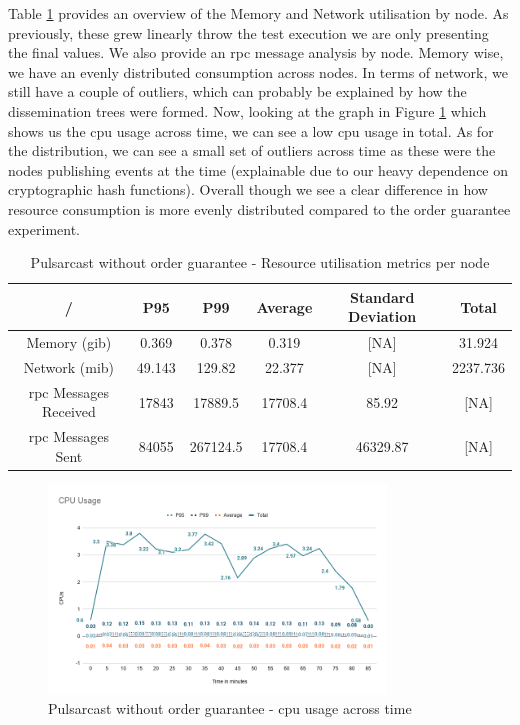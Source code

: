 Table \ref{table:pulsarcast} provides an overview of the Memory and Network
utilisation by node. As previously, these grew linearly throw the test
execution we are only presenting the final values. We also provide an
\acrshort{rpc} message analysis by node. Memory wise, we have an evenly
distributed consumption across nodes. In terms of network, we still have a
couple of outliers, which can probably be explained by how the dissemination
trees were formed.  Now, looking at the graph in Figure
\ref{fig:graph-pulsarcast-cpu} which shows us the \acrshort{cpu} usage across
time, we can see a low \acrshort{cpu} usage in total. As for the distribution,
we can see a small set of outliers across time as these were the nodes
publishing events at the time (explainable due to our heavy dependence on
cryptographic hash functions).  Overall though we see a clear difference in how
resource consumption is more evenly distributed compared to the order guarantee
experiment.

\begin{table}[!htb]
\caption{Pulsarcast without order guarantee - Resource utilisation metrics per node}
\label{table:pulsarcast}
  \begin{center}
   \begin{tabular}{|c| c c c c c|} 
   \hline
   / & P95 & P99 & Average & Standard Deviation & Total \\ [0.5ex] 
   \hline\hline
   Memory (\acrshort{gib}) & 0.369 & 0.378 & 0.319 & [NA] & 31.924 \\
   \hline
   Network (\acrshort{mib}) & 49.143 & 129.82 & 22.377 & [NA] & 2237.736 \\
   \hline
   \acrshort{rpc} Messages Received & 17843 & 17889.5 & 17708.4 & 85.92 & [NA] \\
   \hline
   \acrshort{rpc} Messages Sent & 84055 & 267124.5 & 17708.4 & 46329.87 & [NA] \\ [1ex] 
   \hline
  \end{tabular}
  \end{center}
\end{table}

\begin{figure}[!htb]
  \centering
  \includegraphics[width=0.8\textwidth]{img/graph-pulsarcast-cpu.png}
  \caption{Pulsarcast without order guarantee - \acrshort{cpu} usage across time}
  \label{fig:graph-pulsarcast-cpu}
\end{figure}

